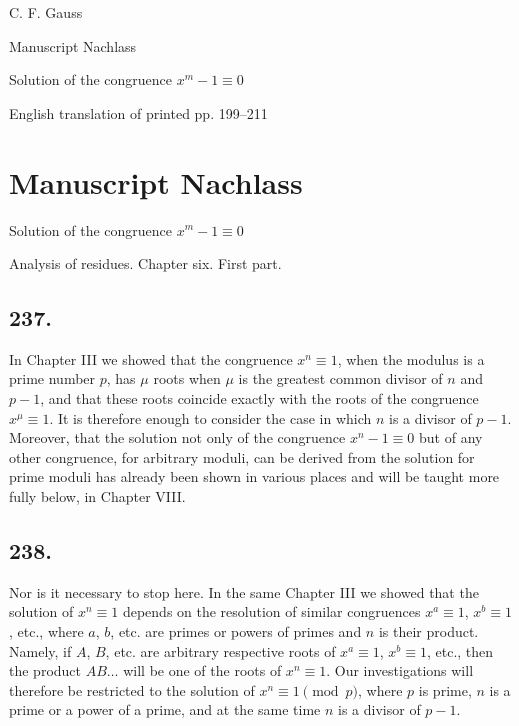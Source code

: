 \documentclass[12pt]{article}
\begin{document}
\begin{center}
{\Large C. F. Gauss}\par
{\large Manuscript Nachlass}\par
{\large Solution of the congruence $x^m-1\equiv0$}\par
{\large English translation of printed pp. 199--211}
\end{center}

\section*{Manuscript Nachlass}

\begin{center}
{\large Solution of the congruence $x^m-1 \equiv 0$}\par
{\large Analysis of residues. Chapter six. First part.}
\end{center}

\subsection*{237.}
In Chapter III we showed that the congruence $x^n\equiv 1$, when the modulus is a prime number $p$, has $\mu$ roots when $\mu$ is the greatest common divisor of $n$ and $p-1$, and that these roots coincide exactly with the roots of the congruence $x^\mu\equiv 1$. It is therefore enough to consider the case in which $n$ is a divisor of $p-1$. Moreover, that the solution not only of the congruence $x^n-1\equiv 0$ but of any other congruence, for arbitrary moduli, can be derived from the solution for prime moduli has already been shown in various places and will be taught more fully below, in Chapter VIII.

\subsection*{238.}
Nor is it necessary to stop here. In the same Chapter III we showed that the solution of $x^n\equiv 1$ depends on the resolution of similar congruences $x^a\equiv 1$, $x^b\equiv 1$, etc., where $a$, $b$, etc. are primes or powers of primes and $n$ is their product. Namely, if $A$, $B$, etc. are arbitrary respective roots of $x^a\equiv 1$, $x^b\equiv 1$, etc., then the product $AB\ldots$ will be one of the roots of $x^n\equiv 1$. Our investigations will therefore be restricted to the solution of $x^n\equiv 1\pmod p$, where $p$ is prime, $n$ is a prime or a power of a prime, and at the same time $n$ is a divisor of $p-1$.
\end{document}
